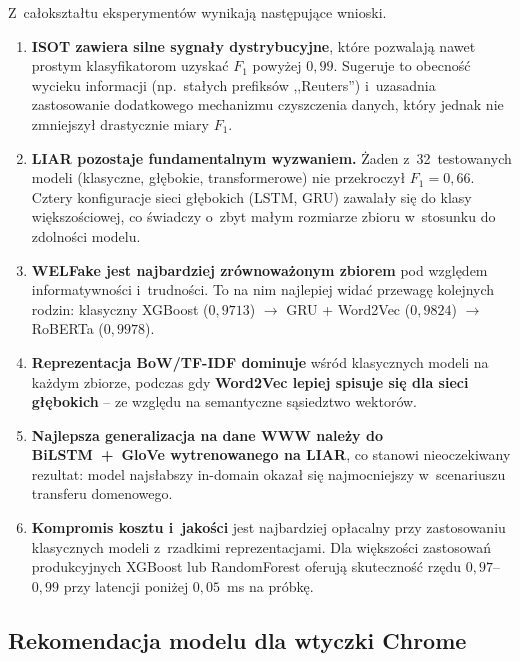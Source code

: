 \documentclass[oneside,polski,logo]{amuthesis}
\begin{document}
Z~całokształtu eksperymentów wynikają następujące wnioski.

\begin{enumerate}
  \item \textbf{ISOT zawiera silne sygnały dystrybucyjne}, które
        pozwalają nawet prostym klasyfikatorom uzyskać $F_1$
        powyżej \(0{,}99\). Sugeruje to obecność wycieku informacji
        (np.\ stałych prefiksów ,,Reuters'') i~uzasadnia zastosowanie
        dodatkowego mechanizmu czyszczenia danych,
        który jednak nie zmniejszył drastycznie miary $F_1$.
  \item \textbf{LIAR pozostaje fundamentalnym wyzwaniem.} Żaden
        z~32~testowanych modeli (klasyczne, głębokie, transformerowe)
        nie przekroczył $F_1 = 0{,}66$. Cztery konfiguracje sieci
        głębokich (LSTM, GRU) zawalały się do klasy większościowej,
        co świadczy o~zbyt małym rozmiarze zbioru w~stosunku do
        zdolności modelu.
  \item \textbf{WELFake jest najbardziej zrównoważonym zbiorem} pod
        względem informatywności i~trudności. To na nim najlepiej
        widać przewagę kolejnych rodzin: klasyczny XGBoost
        (\(0{,}9713\)) $\to$ GRU + Word2Vec (\(0{,}9824\)) $\to$
        RoBERTa (\(0{,}9978\)).
  \item \textbf{Reprezentacja BoW/TF-IDF dominuje} wśród klasycznych
        modeli na każdym zbiorze, podczas gdy \textbf{Word2Vec lepiej
        spisuje się dla sieci głębokich} -- ze względu na semantyczne
        sąsiedztwo wektorów.
  \item \textbf{Najlepsza generalizacja na dane WWW należy do
        BiLSTM~+~GloVe wytrenowanego na LIAR}, co stanowi
        nieoczekiwany rezultat: model najsłabszy in-domain okazał
        się najmocniejszy w~scenariuszu transferu domenowego.
  \item \textbf{Kompromis kosztu i~jakości} jest najbardziej
        opłacalny przy zastosowaniu klasycznych modeli z~rzadkimi
        reprezentacjami. Dla większości zastosowań produkcyjnych
        XGBoost lub RandomForest oferują skuteczność rzędu
        \(0{,}97\)--\(0{,}99\) przy latencji poniżej \(0{,}05\)~ms
        na próbkę.
\end{enumerate}

\subsection{Rekomendacja modelu dla wtyczki Chrome}
\label{sec:podsum_rekomendacja}
\end{document}
